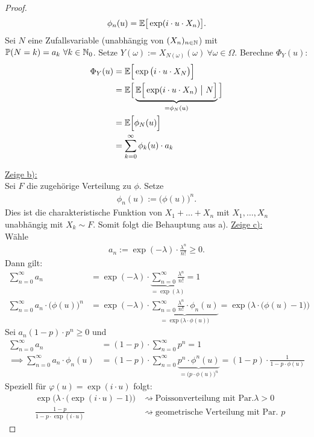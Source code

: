 \documentclass[12pt,a4paper]{article}
\begin{document}
\begin{proof}
\begin{align*}
		\phi_n(u)=\mathbb{E}\big[\exp(i\cdot u\cdot X_n)\big].
	\end{align*}
	Sei $N$ eine Zufallsvariable (unabhängig von $(X_n)_{n\in\mathbb{N}}$) mit $\mathbb{P}(N=k)=a_k~\forall k\in\mathbb{N}_0$.
	Setze $Y(\omega):=X_{N(\omega)}(\omega)~\forall\omega\in\Omega$.
	Berechne $\Phi_Y(u)$:
	\begin{align*}
		\Phi_Y(u)
		&=\mathbb{E}\Big[\exp\big(i\cdot u\cdot X_N\big)\Big]\\
		&=\mathbb{E}\Big[\underbrace{\mathbb{E}\Big[\exp(i\cdot u\cdot X_n)~\big|~N\Big]}_{=\phi_N(u)}\Big]\\
		&=\mathbb{E}\Big[\phi_N(u)\Big]\\
		&=\sum\limits_{k=0}^\infty\phi_k(u)\cdot a_k
	\end{align*}
	
	\underline{Zeige b):}\\
	Sei $F$ die zugehörige Verteilung zu $\phi$.
	Setze
	\begin{align*}
		\phi_n(u):=\big(\phi(u)\big)^n.
	\end{align*}
	Dies ist die charakteristische Funktion von $X_1+\ldots+X_n$ mit $X_1,\ldots,X_n$ unabhängig mit $X_k\sim F$.
	Somit folgt die Behauptung aus a).\nl
	\underline{Zeige c):}\\
	Wähle
	\begin{align*}
		a_n:=\exp(-\lambda)\cdot\frac{\lambda^n}{n!}\geq0.
	\end{align*}
	Dann gilt:
	\begin{align*}
		\sum\limits_{n=0}^\infty a_n
		&=\exp(-\lambda)\cdot\underbrace{\sum\limits_{n=0}^\infty\frac{\lambda^n}{n!}}_{=\exp(\lambda)}=1\\
		\sum\limits_{n=0}^\infty a_n\cdot\big(\phi(u)\big)^n
		&=\exp(-\lambda)\cdot\underbrace{\sum\limits_{n=0}^\infty\frac{\lambda^n}{n!}\cdot\phi_n(u)}_{=\exp\big(\lambda\cdot\phi(u)\big)}
		=\exp\Big(\lambda\cdot\big(\phi(u)-1\big)\Big)
	\end{align*}
	Sei $a_n(1-p)\cdot p^n\geq0$ und 
	\begin{align*}
		\sum\limits_{n=0}^\infty a_n&=(1-p)\cdot\sum\limits_{n=0}^\infty p^n=1\\
		\implies
		\sum\limits_{n=0}^\infty a_n\cdot\phi_n(u)
		&=(1-p)\cdot\sum\limits_{n=0}^\infty\underbrace{p^n\cdot\phi^n(u)}_{=\big(p\cdot\phi(u)\big)^n}
		=(1-p)\cdot\frac{1}{1-p\cdot\phi(u)}
	\end{align*}		
	Speziell für $\varphi(u)=\exp(i\cdot u)$ folgt:
	\begin{align*}
		&\exp\Big(\lambda\cdot\big(\exp(i\cdot u)-1\big)\Big) &\rightsquigarrow\text{Poissonverteilung mit Par.}\lambda>0\\
		&\frac{1-p}{1-p\cdot\exp(i\cdot u)}	&\rightsquigarrow\text{geometrische Verteilung mit Par. }p
	\end{align*}
\end{proof}
\end{document}
